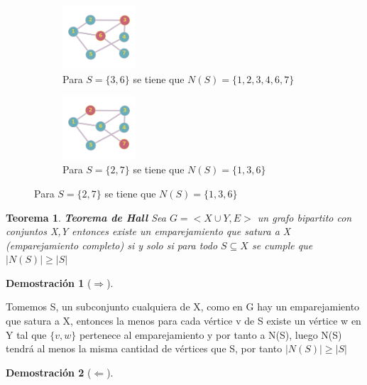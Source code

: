 \documentclass[a4paper,1pt]{report}
\newtheorem*{teo}{Teorema}
\newtheorem*{dem}{Demostración}
\begin{document}
\begin{figure}[H]
    \centering
    \begin{subfigure}[b]{0.70\textwidth}
        \centering
        \includegraphics[width=0.3\textwidth]{figures7/vecindario.png}
        \caption{Para $S = \{3,6\}$ se tiene que $N(S) = \{1,2,3,4,6,7\}$}
    \end{subfigure} 
    \begin{subfigure}[b]{0.70\textwidth}
        \centering
        \includegraphics[width=0.3\textwidth]{figures7/vecindario2.png}
        \caption{Para $S = \{2,7\}$ se tiene que $N(S) = \{1,3,6\}$}
    \end{subfigure}
\end{figure} 

\begin{teo}
 \textbf{Teorema de Hall} Sea $G=<X\cup Y, E>$ un grafo bipartito con conjuntos X,Y entonces existe un emparejamiento que satura a X (emparejamiento completo) si y solo si para todo $S\subseteq X$ se cumple que $|N(S)|\geq |S|$
\end{teo}

\begin{dem}[$\Rightarrow$]
 
\end{dem}

Tomemos S, un subconjunto cualquiera de X, como en G hay un emparejamiento que satura a X, entonces la menos para cada vértice v de S existe un vértice w en Y tal que $\{v,w\}$ pertenece al emparejamiento y por tanto a N(S), luego N(S) tendrá al menos la misma cantidad de vértices que S, por tanto $|N(S)|\geq |S|$\\


\begin{dem}[$\Leftarrow$]
 
\end{dem}
\end{document}
